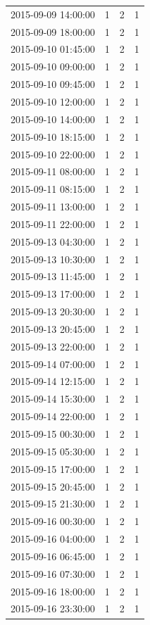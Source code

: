 \begin{tabular}{lrrr}
2015-09-09 14:00:00 & 1 & 2 & 1 \\
2015-09-09 18:00:00 & 1 & 2 & 1 \\
2015-09-10 01:45:00 & 1 & 2 & 1 \\
2015-09-10 09:00:00 & 1 & 2 & 1 \\
2015-09-10 09:45:00 & 1 & 2 & 1 \\
2015-09-10 12:00:00 & 1 & 2 & 1 \\
2015-09-10 14:00:00 & 1 & 2 & 1 \\
2015-09-10 18:15:00 & 1 & 2 & 1 \\
2015-09-10 22:00:00 & 1 & 2 & 1 \\
2015-09-11 08:00:00 & 1 & 2 & 1 \\
2015-09-11 08:15:00 & 1 & 2 & 1 \\
2015-09-11 13:00:00 & 1 & 2 & 1 \\
2015-09-11 22:00:00 & 1 & 2 & 1 \\
2015-09-13 04:30:00 & 1 & 2 & 1 \\
2015-09-13 10:30:00 & 1 & 2 & 1 \\
2015-09-13 11:45:00 & 1 & 2 & 1 \\
2015-09-13 17:00:00 & 1 & 2 & 1 \\
2015-09-13 20:30:00 & 1 & 2 & 1 \\
2015-09-13 20:45:00 & 1 & 2 & 1 \\
2015-09-13 22:00:00 & 1 & 2 & 1 \\
2015-09-14 07:00:00 & 1 & 2 & 1 \\
2015-09-14 12:15:00 & 1 & 2 & 1 \\
2015-09-14 15:30:00 & 1 & 2 & 1 \\
2015-09-14 22:00:00 & 1 & 2 & 1 \\
2015-09-15 00:30:00 & 1 & 2 & 1 \\
2015-09-15 05:30:00 & 1 & 2 & 1 \\
2015-09-15 17:00:00 & 1 & 2 & 1 \\
2015-09-15 20:45:00 & 1 & 2 & 1 \\
2015-09-15 21:30:00 & 1 & 2 & 1 \\
2015-09-16 00:30:00 & 1 & 2 & 1 \\
2015-09-16 04:00:00 & 1 & 2 & 1 \\
2015-09-16 06:45:00 & 1 & 2 & 1 \\
2015-09-16 07:30:00 & 1 & 2 & 1 \\
2015-09-16 18:00:00 & 1 & 2 & 1 \\
2015-09-16 23:30:00 & 1 & 2 & 1 \\

\end{tabular}
